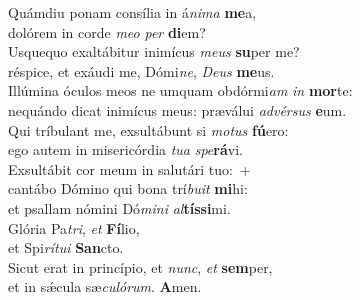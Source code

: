 \evenverse Quámdiu ponam consília in á\textit{ni}\textit{ma} \textbf{me}a,~\*\\
\evenverse dolórem in corde \textit{me}\textit{o} \textit{per} \textbf{di}em?\\
\oddverse Usquequo exaltábitur inimícus \textit{me}\textit{us} \textbf{su}per me?~\*\\
\oddverse réspice, et exáudi me, Dómi\textit{ne}, \textit{De}\textit{us} \textbf{me}us.\\
\evenverse Illúmina óculos meos ne umquam obdórmi\textit{am} \textit{in} \textbf{mor}te:~\*\\
\evenverse nequándo dicat inimícus meus: præválui \textit{ad}\textit{vér}\textit{sus} \textbf{e}um.\\
\oddverse Qui tríbulant me, exsultábunt si \textit{mo}\textit{tus} \textbf{fú}ero:~\*\\
\oddverse ego autem in misericórdia \textit{tu}\textit{a} \textit{spe}\textbf{rá}vi.\\
\evenverse Exsultábit cor meum in salutári tuo:~+\\
\evenverse  cantábo Dómino qui bona trí\textit{bu}\textit{it} \textbf{mi}hi:~\*\\
\evenverse et psallam nómini Dó\textit{mi}\textit{ni} \textit{al}\textbf{tís}\textbf{si}mi.\\
\oddverse Glória Pa\textit{tri}, \textit{et} \textbf{Fí}lio,~\*\\
\oddverse et Spi\textit{rí}\textit{tu}\textit{i} \textbf{San}cto.\\
\evenverse Sicut erat in princípio, et \textit{nunc}, \textit{et} \textbf{sem}per,~\*\\
\evenverse et in sǽcula sæ\textit{cu}\textit{ló}\textit{rum}. \textbf{A}men.\\
